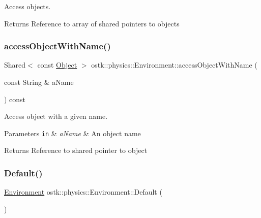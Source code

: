 Access objects. 

\begin{DoxyReturn}{Returns}
Reference to array of shared pointers to objects 
\end{DoxyReturn}
\mbox{\label{classostk_1_1physics_1_1_environment_a4e616b93d403fffa2ed69bedad6b8b99}} 
\subsubsection{\texorpdfstring{access\+Object\+With\+Name()}{accessObjectWithName()}}
{\footnotesize\ttfamily Shared$<$ const \hyperlink{classostk_1_1physics_1_1env_1_1_object}{Object} $>$ ostk\+::physics\+::\+Environment\+::access\+Object\+With\+Name (\begin{DoxyParamCaption}\item[{const String \&}]{a\+Name }\end{DoxyParamCaption}) const}



Access object with a given name. 


\begin{DoxyParams}[1]{Parameters}
\mbox{\tt in}  & {\em a\+Name} & An object name \\
\hline
\end{DoxyParams}
\begin{DoxyReturn}{Returns}
Reference to shared pointer to object 
\end{DoxyReturn}
\mbox{\label{classostk_1_1physics_1_1_environment_af713ff358f251bedc1c837e3efac59a4}} 
\subsubsection{\texorpdfstring{Default()}{Default()}}
{\footnotesize\ttfamily \hyperlink{classostk_1_1physics_1_1_environment}{Environment} ostk\+::physics\+::\+Environment\+::\+Default (\begin{DoxyParamCaption}{ }\end{DoxyParamCaption})\hspace{0.3cm}{\ttfamily [static]}}



